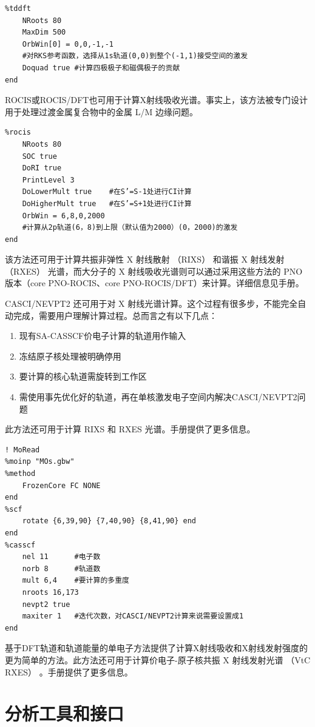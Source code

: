 \documentclass{ctexart}
\begin{document}
	\begin{lstlisting}
%tddft
	NRoots 80	
	MaxDim 500
	OrbWin[0] = 0,0,-1,-1	
	#对RKS参考函数，选择从1s轨道(0,0)到整个(-1,1)接受空间的激发
	Doquad true	#计算四极极子和磁偶极子的贡献
end
	\end{lstlisting}
	
	ROCIS或ROCIS/DFT也可用于计算X射线吸收光谱。事实上，该方法被专门设计用于处理过渡金属复合物中的金属 L/M 边缘问题。
	
	\begin{lstlisting}
%rocis 
	NRoots 80
	SOC true	
	DoRI true	
	PrintLevel 3
	DoLowerMult true	#在S’=S-1处进行CI计算
	DoHigherMult true	#在S’=S+1处进行CI计算
	OrbWin = 6,8,0,2000	
	#计算从2p轨道(6，8)到上限（默认值为2000）(0，2000)的激发
end
	\end{lstlisting}
	
	该方法还可用于计算共振非弹性 X 射线散射 （RIXS） 和谐振 X 射线发射 （RXES） 光谱，而大分子的 X 射线吸收光谱则可以通过采用这些方法的 PNO 版本（core PNO-ROCIS、core PNO-ROCIS/DFT）来计算。详细信息见手册。
	
	
	CASCI/NEVPT2 还可用于对 X 射线光谱计算。这个过程有很多步，不能完全自动完成，需要用户理解计算过程。总而言之有以下几点：
	\begin{enumerate}[1.]
		\item  现有SA-CASSCF价电子计算的轨道用作输入
		\item 冻结原子核处理被明确停用
		\item 要计算的核心轨道需旋转到工作区
		\item 需使用事先优化好的轨道，再在单核激发电子空间内解决CASCI/NEVPT2问题
		
	\end{enumerate}

	此方法还可用于计算 RIXS 和 RXES 光谱。手册提供了更多信息。
	
	\begin{lstlisting}
! MoRead
%moinp "MOs.gbw"
%method
	FrozenCore FC NONE
end
%scf
	rotate {6,39,90} {7,40,90} {8,41,90} end
end
%casscf
	nel 11		#电子数
	norb 8		#轨道数
	mult 6,4	#要计算的多重度
	nroots 16,173 
	nevpt2 true	
	maxiter 1	#迭代次数，对CASCI/NEVPT2计算来说需要设置成1
end
	\end{lstlisting}
	
	基于DFT轨道和轨道能量的单电子方法提供了计算X射线吸收和X射线发射强度的更为简单的方法。此方法还可用于计算价电子-原子核共振 X 射线发射光谱 （VtC RXES） 。手册提供了更多信息。
	
	\section{分析工具和接口}
	
\end{document}
